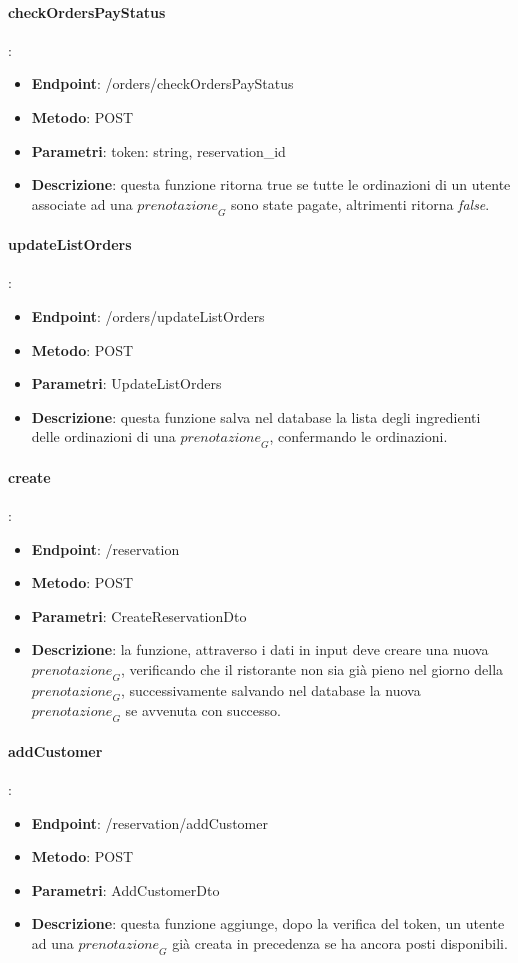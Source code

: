 \paragraph{checkOrdersPayStatus}:
\begin{itemize}
    \item \textbf{Endpoint}: /orders/checkOrdersPayStatus
    \item \textbf{Metodo}: POST
    \item \textbf{Parametri}: token: string, reservation\_id
    \item \textbf{Descrizione}: questa funzione ritorna true se tutte le ordinazioni di un utente associate ad una $\textit{prenotazione}_G$ sono state pagate, altrimenti ritorna \emph{false}.
\end{itemize}
\paragraph{updateListOrders}:
\begin{itemize}
    \item \textbf{Endpoint}: /orders/updateListOrders
    \item \textbf{Metodo}: POST
    \item \textbf{Parametri}: UpdateListOrders
    \item \textbf{Descrizione}: questa funzione salva nel database la lista degli ingredienti delle ordinazioni di una $\textit{prenotazione}_G$, confermando le ordinazioni.
\end{itemize}
\paragraph{create}:
\begin{itemize}
    \item \textbf{Endpoint}: /reservation
    \item \textbf{Metodo}: POST
    \item \textbf{Parametri}: CreateReservationDto
    \item \textbf{Descrizione}: la funzione, attraverso i dati in input deve creare una nuova $\textit{prenotazione}_G$, verificando che il ristorante non sia già pieno nel giorno della $\textit{prenotazione}_G$, successivamente salvando nel database la nuova $\textit{prenotazione}_G$ se avvenuta con successo.
\end{itemize}
\paragraph{addCustomer}:
\begin{itemize}
    \item \textbf{Endpoint}: /reservation/addCustomer
    \item \textbf{Metodo}: POST
    \item \textbf{Parametri}: AddCustomerDto
    \item \textbf{Descrizione}: questa funzione aggiunge, dopo la verifica del token, un utente ad una $\textit{prenotazione}_G$ già creata in precedenza se ha ancora posti disponibili.
\end{itemize}
